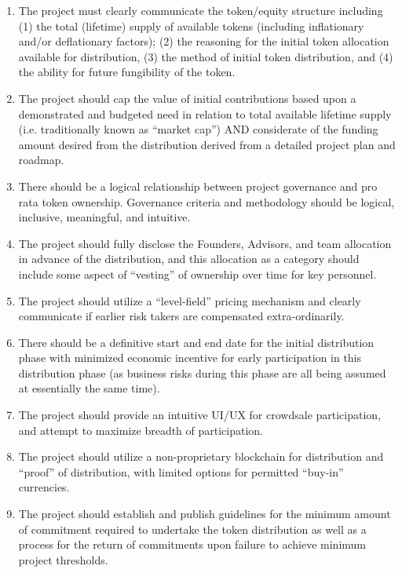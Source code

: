 \documentclass[12pt]{article}
\begin{document}
\begin{enumerate}
    \item The project must clearly communicate the token/equity structure including (1) the total (lifetime) supply of available tokens (including inflationary and/or deflationary factors); (2) the reasoning for the initial token allocation available for distribution, (3) the method of initial token distribution, 
    and (4) the ability for future fungibility of the token.
    
    \item The project should cap the value of initial contributions based upon a demonstrated and budgeted need in relation to total available lifetime supply (i.e. traditionally known as “market cap”) AND considerate of the funding amount desired from the distribution derived from a detailed project plan and roadmap.
    
    \item There should be a logical relationship between project governance and pro rata token ownership. Governance criteria and methodology should be logical, inclusive, meaningful, and intuitive.
    
    \item The project should fully disclose the Founders, Advisors, and team allocation in advance of the distribution, and this allocation as a category should include some aspect of “vesting” of ownership over time for key personnel.

    \item The project should utilize a “level-field” pricing mechanism and clearly communicate if earlier risk takers are compensated extra-ordinarily.
    
    \item There should be a definitive start and end date for the initial distribution phase with minimized economic incentive for early participation in this distribution phase (as business risks during this phase are all being assumed at essentially the same time).
    
    \item The project should provide an intuitive UI/UX for crowdsale participation, and attempt to maximize breadth of participation.

    \item The project should utilize a non-proprietary blockchain for distribution and “proof” of distribution, with limited options for permitted “buy-in” currencies.


    \item The project should establish and publish guidelines for the minimum amount of commitment required to undertake the token distribution as well as a process for the return of commitments upon failure to achieve minimum project thresholds.

\end{enumerate}
\end{document}
